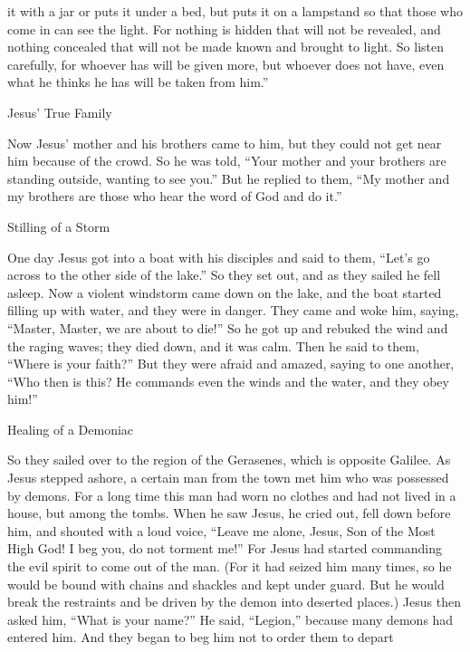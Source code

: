 {it
with a jar
or
puts
it under
a bed,
but
puts
it on
a lampstand
so that
those who come in
can see
the light.
For
nothing
is
hidden
that
will
not
be
revealed,
and nothing
concealed
that
will
not
be made known
and
brought
to
light.
So
listen
carefully,
for
whoever
has
will be given
more, but
whoever
does not
have,
even
what
he thinks
he has
will be taken
from
him.”
\par }{\SH Jesus’ True Family
\par }{\PP {}Now
Jesus’ mother
and
his
brothers
came
to
him,
but
they could
not
get near
him
because
of the crowd.
So
he was told,
“Your
mother
and
your
brothers
are standing
outside,
wanting
to see
you.”
But
he replied
to
them,
“My
mother
and
my
brothers
are
those
who hear
the word
of God
and
do it.”
\par }{\SH Stilling of a Storm
\par }{\PP {}One
day
Jesus got
into
a boat
with his
disciples
and
said
to
them,
“Let’s go across
to
the other side
of the lake.”
So
they set out,
and
as
they
sailed
he fell asleep.
Now a violent windstorm
came down
on the
lake,
and
the boat started filling up with water,
and
they were in danger.
They came
and
woke
him,
saying,
“Master,
Master, we are about to die!” So he got up and rebuked the wind and the raging waves; they died down, and it was calm.
Then
he said
to them,
“Where
is your
faith?” But
they were afraid
and amazed,
saying
to
one another,
“Who
then
is
this? He
commands
even the winds
and
the water,
and
they obey
him!”
\par }{\SH Healing of a Demoniac
\par }{\PP {}So
they sailed over
to
the region
of the Gerasenes,
which
is
opposite
Galilee.
As Jesus stepped
ashore,
a certain
man
from
the town
met
him who was possessed
by demons.
For
a long
time
this man had worn
no
clothes
and
had
not
lived
in
a house,
but
among
the tombs.
When
he saw
Jesus,
he cried out,
fell down
before him,
and
shouted
with a loud
voice,
“Leave me
alone, Jesus,
Son
of the Most High
God! I beg
you,
do
not
torment
me!”
For
Jesus had started commanding
the evil
spirit
to come out
of
the man.
(For
it had seized
him
many
times,
so
he would be bound
with chains
and
shackles
and kept under guard.
But
he would break
the restraints
and be driven
by
the demon
into
deserted places.)
Jesus
then asked
him,
“What
is
your
name?” He said,
“Legion,”
because
many
demons
had entered
him.
And
they began to beg
him
not
to order
them
to depart
}
